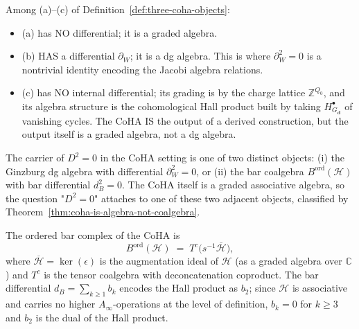 \begin{remark}
\label{rem:which-carries-differential}
Among (a)--(c) of Definition~\ref{def:three-coha-objects}:
\begin{itemize}
 \item (a) has NO differential; it is a graded algebra.
 \item (b) HAS a differential $\partial_W$; it is a dg algebra. This is
 where $\partial_W^2 = 0$ is a nontrivial identity encoding the
 Jacobi algebra relations.
 \item (c) has NO internal differential; its grading is by the charge
 lattice $\mathbb{Z}^{Q_0}$, and its algebra structure is the
 cohomological Hall product built by taking $H^\bullet_{G_\mathbf{d}}$
 of vanishing cycles. The CoHA IS the output of a derived
 construction, but the output itself is a graded algebra, not a dg
 algebra.
\end{itemize}
The carrier of $D^2 = 0$ in the CoHA setting is one of two distinct
objects: (i) the Ginzburg dg algebra with differential
$\partial_W^2 = 0$, or (ii) the bar coalgebra
$B^{\mathrm{ord}}(\mathcal{H})$ with bar differential $d_B^2 = 0$.
The CoHA itself is a graded associative algebra, so the question
"$D^2 = 0$" attaches to one of these two adjacent objects,
classified by Theorem~\ref{thm:coha-is-algebra-not-coalgebra}.
\end{remark}

\begin{definition}
\label{def:bar-of-coha-platonic}
The ordered bar complex of the CoHA is
\[
 B^{\mathrm{ord}}(\mathcal{H})
 \;=\; T^c\bigl( s^{-1} \overline{\mathcal{H}} \bigr),
\]
where $\overline{\mathcal{H}} = \ker(\epsilon)$ is the augmentation
ideal of $\mathcal{H}$ (as a graded algebra over $\mathbb{C}$) and
$T^c$ is the tensor coalgebra with deconcatenation coproduct. The
bar differential $d_B = \sum_{k \geq 1} b_k$ encodes the Hall product
as $b_2$; since $\mathcal{H}$ is associative and carries no higher
$A_\infty$-operations at the level of definition, $b_k = 0$ for
$k \geq 3$ and $b_2$ is the dual of the Hall product.
\end{definition}

